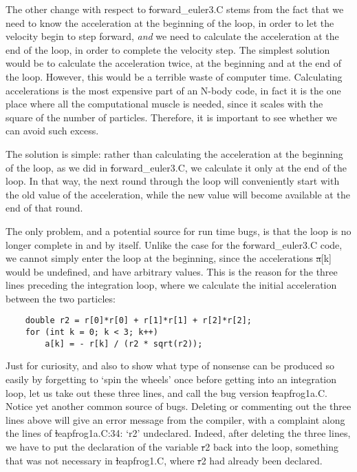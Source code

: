The other change with respect to {\st forward\_euler3.C} stems from
the fact that we need to know the acceleration at the beginning of the
loop, in order to let the velocity begin to step forward, {\it and} we
need to calculate the acceleration at the end of the loop, in order to
complete the velocity step.  The simplest solution would be to
calculate the acceleration twice, at the beginning and at the end of
the loop.  However, this would be a terrible waste of computer time.
Calculating accelerations is the most expensive part of an N-body code,
in fact it is the one place where all the computational muscle is
needed, since it scales with the square of the number of particles.
Therefore, it is important to see whether we can avoid such excess.

The solution is simple: rather than calculating the acceleration at
the beginning of the loop, as we did in {\st forward\_euler3.C}, we
calculate it only at the end of the loop.  In that way, the next round
through the loop will conveniently start with the old value of the
acceleration, while the new value will become available at the end of
that round.

The only problem, and a potential source for run time bugs, is that the
loop is no longer complete in and by itself.  Unlike the case for the
{\st forward\_euler3.C} code, we cannot simply enter the loop at the
beginning, since the accelerations {\st a[k]} would be undefined, and
have arbitrary values.  This is the reason for the three lines
preceding the integration loop, where we calculate the initial
acceleration between the two particles:

\begin{small}
\begin{verbatim}
    double r2 = r[0]*r[0] + r[1]*r[1] + r[2]*r[2];
    for (int k = 0; k < 3; k++)
        a[k] = - r[k] / (r2 * sqrt(r2));
\end{verbatim}
\end{small}

Just for curiosity, and also to show what type of nonsense can be
produced so easily by forgetting to `spin the wheels' once before
getting into an integration loop, let us take out these three lines,
and call the bug version {\st leapfrog1a.C}.  Notice yet another
common source of bugs.  Deleting or commenting out the three lines
above will give an error message from the compiler, with a complaint
along the lines of {\st leapfrog1a.C:34: `r2' undeclared}.  Indeed,
after deleting the three lines, we have to put the declaration of the
variable {\st r2} back into the loop, something that was not necessary
in {\st leapfrog1.C}, where {\st r2} had already been declared.

